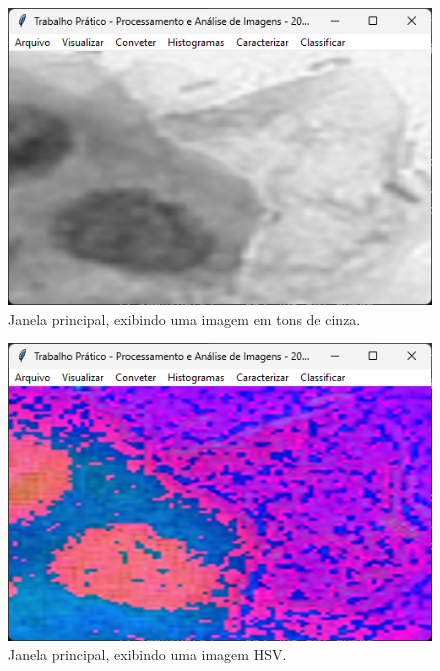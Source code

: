\documentclass[12pt]{article}
\begin{document}
\begin{figure}
    \centering
    \includegraphics{Captura de tela 2024-06-10 094843.png}
    \caption{Janela principal, exibindo uma imagem em tons de cinza.}
    \label{fig:janela-principal-tons-cinza}
\end{figure}

\begin{figure}
    \centering
    \includegraphics{Captura de tela 2024-06-10 094858.png}
    \caption{Janela principal, exibindo uma imagem HSV.}
    \label{fig:janela-principal-hsv}
\end{figure}
\end{document}
